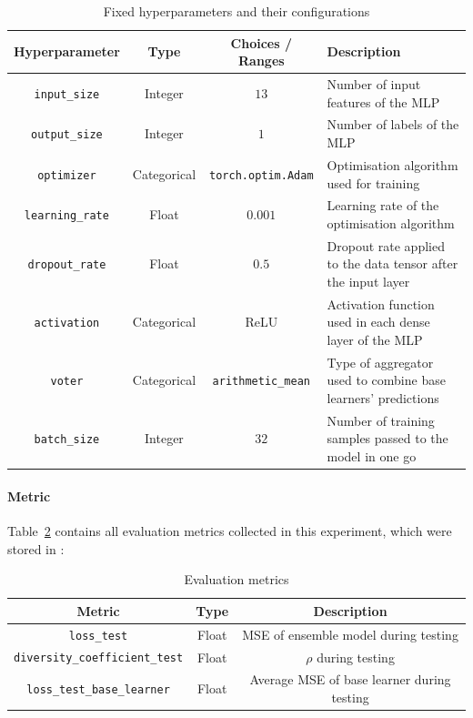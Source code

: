 \documentclass{article}
\begin{document}
\begin{table}[H]
    \centering
    \begin{tabular}{|c|c|c|p{5cm}|}
        \hline
        Hyperparameter & Type & Choices / Ranges & Description \\
        \hline
        \small\texttt{input\_size} & Integer & $13$ & Number of input features of the MLP \\
        \hline
        \small\texttt{output\_size} & Integer & $1$ & Number of labels of the MLP \\
        \hline
        \small\texttt{optimizer} & Categorical & \texttt{torch.optim.Adam} & Optimisation algorithm used for training \\
        \hline
        \small\texttt{learning\_rate} & Float & $0.001$ & Learning rate of the optimisation algorithm \\
        \hline
        \small\texttt{dropout\_rate} & Float & $0.5$ & Dropout rate applied to the data tensor after the input layer \\
        \hline
        \small\texttt{activation} & Categorical & ReLU & Activation function used in each dense layer of the MLP \\
        \hline
        \small\texttt{voter} & Categorical & \texttt{arithmetic\_mean} & Type of aggregator used to combine base learners' predictions \\
        \hline
        \small\texttt{batch\_size} & Integer & $32$ & Number of training samples passed to the model in one go \\
        \hline
    \end{tabular}
    \caption{Fixed hyperparameters and their configurations}
    \label{table:experiment_2_fixed_hyperparameters}
\end{table}

\paragraph{Metric}
Table~\ref{table:experiment_2_metric} contains all evaluation metrics collected in this experiment, which were stored in : 

\begin{table}[H]
    \centering
    \begin{tabular}{|c|c|c|}
        \hline
        Metric & Type & Description \\
        \hline
        \small\texttt{loss\_test} & Float & MSE of ensemble model during testing \\
        \hline
        \small\texttt{diversity\_coefficient\_test} & Float & $\rho$ during testing \\
        \hline
        \small\texttt{loss\_test\_base\_learner} & Float & Average MSE of base learner during testing \\
        \hline
    \end{tabular}
    \caption{Evaluation metrics}
    \label{table:experiment_2_metric}
\end{table}
\end{document}
